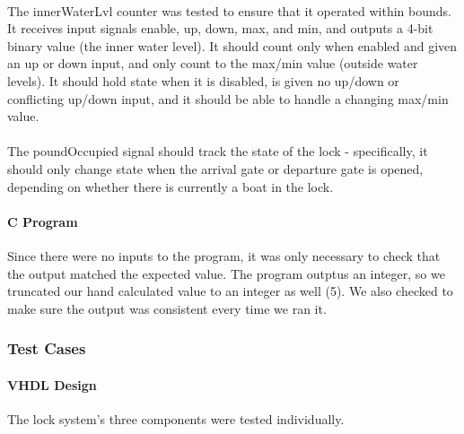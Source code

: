 \documentclass{article}
\begin{document}
      \paragraph{} The innerWaterLvl counter was tested to ensure that it operated within bounds. It receives input signals enable, up, down, max, and min, and outputs a 4-bit binary value (the inner water level). It should count only when enabled and given an up or down input, and only count to the max/min value (outside water levels). It should hold state when it is disabled, is given no up/down or conflicting up/down input, and it should be able to handle a changing max/min value.

      \paragraph{} The poundOccupied signal should track the state of the lock - specifically, it should only change state when the arrival gate or departure gate is opened, depending on whether there is currently a boat in the lock.

      \paragraph{C Program} Since there were no inputs to the program, it was only necessary to check that the output matched the expected value. The program outptus an integer, so we truncated our hand calculated value to an integer as well (5). We also checked to make sure the output was consistent every time we ran it.

		\subsubsection{Test Cases}
      \paragraph{VHDL Design} The lock system's three components were tested individually.
\end{document}
